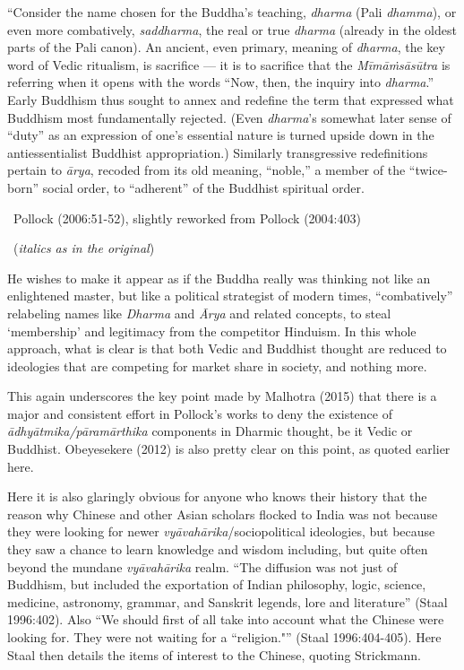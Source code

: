 \begin{myquote}
“Consider the name chosen for the Buddha’s teaching, \textit{dharma} (Pali \textit{dhamma}), or even more combatively, \textit{saddharma}, the real or true \textit{dharma} (already in the oldest parts of the Pali canon). An ancient, even primary, meaning of \textit{dharma}, the key word of Vedic ritualism, is sacriﬁce — it is to sacriﬁce that the \textit{Mīmāṁsāsūtra} is referring when it opens with the words “Now, then, the inquiry into \textit{dharma}.” Early Buddhism thus sought to annex and redeﬁne the term that expressed what Buddhism most fundamentally rejected. (Even \textit{dharma}’s somewhat later sense of “duty” as an expression of one’s essential nature is turned upside down in the antiessentialist Buddhist appropriation.) Similarly transgressive redeﬁnitions pertain to \textit{ārya}, recoded from its old meaning, “noble,” a member of the “twice-born” social order, to “adherent” of the Buddhist spiritual order. 

~\hfill Pollock (2006:51-52), slightly reworked from Pollock (2004:403)
\end{myquote}

\begin{myquote}

~\hfill (\textit{italics as in the original})
\end{myquote}

He wishes to make it appear as if the Buddha really was thinking not like an enlightened master, but like a political strategist of modern times, “combatively” relabeling names like \textit{Dharma} and \textit{Ārya} and related concepts, to steal ‘membership’ and legitimacy from the competitor Hinduism. In this whole approach, what is clear is that both Vedic and Buddhist thought are reduced to ideologies that are competing for market share in society, and nothing more.

This again underscores the key point made by Malhotra (2015) that there is a major and consistent effort in Pollock’s works to deny the existence of \textit{ādhyātmika/pāramārthika} components in Dharmic thought, be it Vedic or Buddhist. Obeyesekere (2012) is also pretty clear on this point, as quoted earlier here.

Here it is also glaringly obvious for anyone who knows their history that the reason why Chinese and other Asian scholars flocked to India was not because they were looking for newer \textit{vyāvahārika}/sociopolitical ideologies, but because they saw a chance to learn knowledge and wisdom including, but quite often beyond the mundane \textit{vyāvahārika} realm. “The diffusion was not just of Buddhism, but included the exportation of Indian philosophy, logic, science, medicine, astronomy, grammar, and Sanskrit legends, lore and literature” (Staal 1996:402). Also “We should first of all take into account what the Chinese were looking for. They were not waiting for a ``religion."” (Staal 1996:404-405). Here Staal then details the items of interest to the Chinese, quoting Strickmann.

